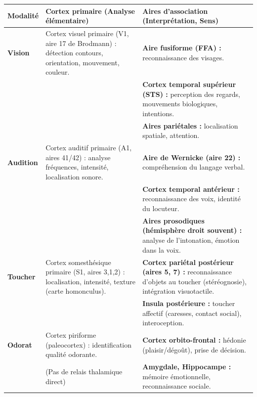 \documentclass[11pt]{article}
\begin{document}
\begin{propriete}
\begin{center}
\begin{tabularx}{\linewidth}{|l|X|X|}\hline
\rowcolor{popblueL}
\textbf{Modalité} & \textbf{Cortex primaire (Analyse élémentaire)} & \textbf{Aires d'association (Interprétation, Sens)} \\ \hline
\textbf{Vision} & Cortex visuel primaire (V1, aire 17 de Brodmann) : détection contours, orientation, mouvement, couleur. & \textbf{Aire fusiforme (FFA) :} reconnaissance des visages.\\
& & \textbf{Cortex temporal supérieur (STS) :} perception des regards, mouvements biologiques, intentions.\\
& & \textbf{Aires pariétales :} localisation spatiale, attention. \\ \hline
\textbf{Audition} & Cortex auditif primaire (A1, aires 41/42) : analyse fréquences, intensité, localisation sonore. & \textbf{Aire de Wernicke (aire 22) :} compréhension du langage verbal.\\
& & \textbf{Cortex temporal antérieur :} reconnaissance des voix, identité du locuteur.\\
& & \textbf{Aires prosodiques (hémisphère droit souvent) :} analyse de l'intonation, émotion dans la voix. \\ \hline
\textbf{Toucher} & Cortex somesthésique primaire (S1, aires 3,1,2) : localisation, intensité, texture (carte homonculus). & \textbf{Cortex pariétal postérieur (aires 5, 7) :} reconnaissance d'objets au toucher (stéréognosie), intégration visuotactile.\\
& & \textbf{Insula postérieure :} toucher affectif (caresses, contact social), interoception. \\ \hline
\textbf{Odorat} & Cortex piriforme (paleocortex) : identification qualité odorante. & \textbf{Cortex orbito-frontal :} hédonie (plaisir/dégoût), prise de décision.\\
& (Pas de relais thalamique direct) & \textbf{Amygdale, Hippocampe :} mémoire émotionnelle, reconnaissance sociale. \\ \hline
\end{tabularx}
\end{center}
\end{propriete}
\end{document}
